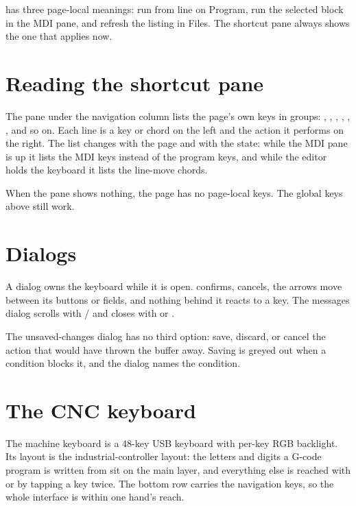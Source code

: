 \begin{notebox}
   has three page-local meanings: run from line on Program, run the
  selected block in the MDI pane, and refresh the listing in Files. The shortcut pane always
  shows the one that applies now.
\end{notebox}

\section{Reading the shortcut pane}

The pane under the navigation column lists the page's own keys in groups: ,
, , , , ,
 and so on. Each line is a key or chord on the left and the action it
performs on the right. The list changes with the page and with the state: while the MDI pane
is up it lists the MDI keys instead of the program keys, and while the editor holds the
keyboard it lists the line-move chords.

When the pane shows nothing, the page has no page-local keys. The global keys above still
work.

\section{Dialogs}

A dialog owns the keyboard while it is open.  confirms,  cancels,
the arrows move between its buttons or fields, and nothing behind it reacts to a key. The
messages dialog scrolls with / and closes with  or
.

The unsaved-changes dialog has no third option: save, discard, or cancel the action that
would have thrown the buffer away. Saving is greyed out when a condition blocks it, and the
dialog names the condition.

\clearpage
\section{The CNC keyboard}
\label{sec:cnckeyboard}

The machine keyboard is a 48-key USB keyboard with per-key RGB backlight. Its layout is the
industrial-controller layout: the letters and digits a G-code program is written from sit on
the main layer, and everything else is reached with  or by tapping a key twice.
The bottom row carries the navigation keys, so the whole interface is within one hand's reach.

